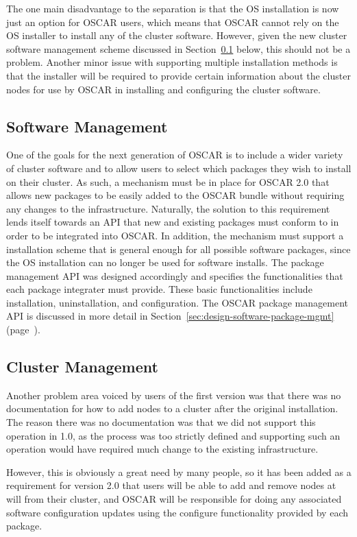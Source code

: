 The one main disadvantage to the separation is that the OS
installation is now just an option for OSCAR users, which means that
OSCAR cannot rely on the OS installer to install any of the cluster
software. However, given the new cluster software management scheme
discussed in Section~\ref{sec:reqs-software-management} below, this
should not be a problem. Another minor issue with supporting multiple
installation methods is that the installer will be required to provide
certain information about the cluster nodes for use by OSCAR in
installing and configuring the cluster software.

\subsection{Software Management}
\label{sec:reqs-software-management}

One of the goals for the next generation of OSCAR is to include a
wider variety of cluster software and to allow users to select which
packages they wish to install on their cluster. As such, a mechanism
must be in place for OSCAR 2.0 that allows new packages to be easily
added to the OSCAR bundle without requiring any changes to the
infrastructure. Naturally, the solution to this requirement lends
itself towards an API that new and existing packages must conform to
in order to be integrated into OSCAR. In addition, the mechanism must
support a installation scheme that is general enough for all possible
software packages, since the OS installation can no longer be used for
software installs. The package management API was designed accordingly
and specifies the functionalities that each package integrater must
provide. These basic functionalities include installation,
uninstallation, and configuration. The OSCAR package management API is
discussed in more detail in
Section~\ref{sec:design-software-package-mgmt}
(page~\pageref{sec:design-software-package-mgmt}).

\subsection{Cluster Management}

Another problem area voiced by users of the first version was that
there was no documentation for how to add nodes to a cluster after the
original installation. The reason there was no documentation was that
we did not support this operation in 1.0, as the process was too
strictly defined and supporting such an operation would have required
much change to the existing infrastructure.

However, this is obviously a great need by many people, so it has been
added as a requirement for version 2.0 that users will be able to add
and remove nodes at will from their cluster, and OSCAR will be
responsible for doing any associated software configuration updates
using the configure functionality provided by each package.

